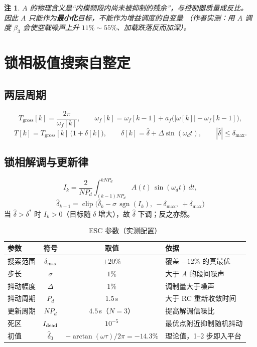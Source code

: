 \documentclass[UTF8,fontset=windows,a4paper,11pt]{ctexart}
\newtheorem{remark}{注}
\newcommand{\clip}{\operatorname{clip}}
\newcommand{\sgn}{\operatorname{sgn}}
\newcommand{\Tg}{T_{\mathrm{gross}}}
\begin{document}
\begin{remark}
$A$ 的物理含义是“内模频段内尚未被抑制的残余”，与控制器质量成\emph{反比}。
因此 $A$ 只能作为\textbf{最小化}目标，不能作为增益调度的自变量
（作者实测：用 $A$ 调度 $\beta_3$ 会使空载噪声上升 $11\%\sim55\%$、加载跌落反而加深）。
\end{remark}

\section{锁相极值搜索自整定}

\subsection{两层周期}
\begin{equation}
\Tg[k]=\frac{2\pi}{\omega_f[k]},\qquad
\omega_f[k]=\omega_f[k-1]+a_f\big(|\omega[k]|-\omega_f[k-1]\big),
\end{equation}
\begin{equation}
T[k]=\Tg[k]\,\big(1+\delta[k]\big),\qquad
\delta[k]=\hat\delta+\Delta\sin(\omega_d t),\qquad |\hat\delta|\le\delta_{\max}.
\end{equation}

\subsection{锁相解调与更新律}
\begin{equation}
I_k=\frac{2}{N P_d}\int_{(k-1)NP_d}^{kNP_d}A(t)\,\sin(\omega_d t)\,dt,
\end{equation}
\begin{equation}
\boxed{\;\hat\delta_{k+1}=\clip\big(\hat\delta_k-\sigma\,\sgn(I_k),\ -\delta_{\max},\ +\delta_{\max}\big)\;}
\end{equation}
当 $\hat\delta>\delta^{*}$ 时 $I_k>0$（目标随 $\delta$ 增大），故 $\hat\delta$ 下调；反之亦然。

\begin{table}[h]
\centering
\caption{ESC 参数（实测配置）}
\begin{tabular}{@{}lccl@{}}
\toprule
参数 & 符号 & 取值 & 依据 \\
\midrule
搜索范围 & $\delta_{\max}$ & $\pm20\%$ & 覆盖 $-12\%$ 的真最优 \\
步长 & $\sigma$ & $1\%$ & 大于 $A$ 的段间噪声 \\
抖动幅度 & $\Delta$ & $1\%$ & 调制量大于噪声 \\
抖动周期 & $P_d$ & $1.5$\,s & 大于 RC 重新收敛时间 \\
更新周期 & $NP_d$ & $4.5$\,s（$N=3$） & 提高解调信噪比 \\
死区 & $I_{\rm dead}$ & $10^{-5}$ & 最优点附近抑制随机抖动 \\
初值 & $\hat\delta_0$ & $-\arctan(\omega\tau)/2\pi=-14.3\%$ & 理论值，1--2 步即入平台 \\
\bottomrule
\end{tabular}
\end{table}
\end{document}
